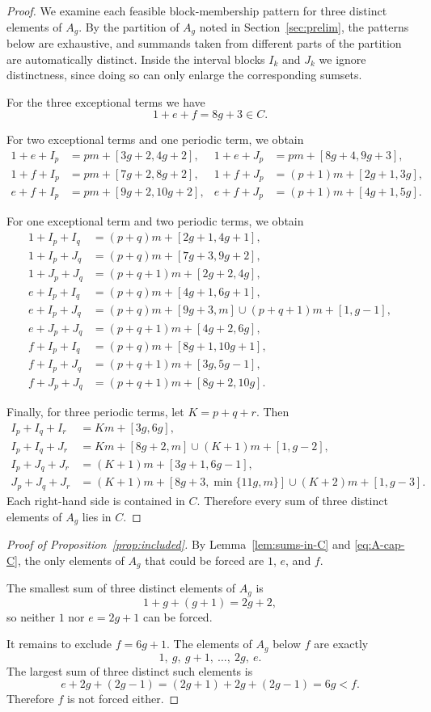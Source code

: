 \documentclass[12pt]{article}
\begin{document}
\begin{proof}
We examine each feasible block-membership pattern for three distinct elements of $A_g$. By the partition of $A_g$ noted in Section~\ref{sec:prelim}, the patterns below are exhaustive, and summands taken from different parts of the partition are automatically distinct. Inside the interval blocks $I_k$ and $J_k$ we ignore distinctness, since doing so can only enlarge the corresponding sumsets.

For the three exceptional terms we have
\[
1+e+f=8g+3\in C.
\]

For two exceptional terms and one periodic term, we obtain
\begin{align*}
1+e+I_p &= pm+[3g+2,4g+2],
& 1+e+J_p &= pm+[8g+4,9g+3], \\
1+f+I_p &= pm+[7g+2,8g+2],
& 1+f+J_p &= (p+1)m+[2g+1,3g], \\
e+f+I_p &= pm+[9g+2,10g+2],
& e+f+J_p &= (p+1)m+[4g+1,5g].
\end{align*}

For one exceptional term and two periodic terms, we obtain
\begin{align*}
1+I_p+I_q &= (p+q)m+[2g+1,4g+1], \\
1+I_p+J_q &= (p+q)m+[7g+3,9g+2], \\
1+J_p+J_q &= (p+q+1)m+[2g+2,4g], \\
e+I_p+I_q &= (p+q)m+[4g+1,6g+1], \\
e+I_p+J_q &= (p+q)m+[9g+3,m]\cup(p+q+1)m+[1,g-1], \\
e+J_p+J_q &= (p+q+1)m+[4g+2,6g], \\
f+I_p+I_q &= (p+q)m+[8g+1,10g+1], \\
f+I_p+J_q &= (p+q+1)m+[3g,5g-1], \\
f+J_p+J_q &= (p+q+1)m+[8g+2,10g].
\end{align*}

Finally, for three periodic terms, let $K=p+q+r$. Then
\begin{align*}
I_p+I_q+I_r &= Km+[3g,6g], \\
I_p+I_q+J_r &= Km+[8g+2,m]\cup(K+1)m+[1,g-2], \\
I_p+J_q+J_r &= (K+1)m+[3g+1,6g-1], \\
J_p+J_q+J_r &= (K+1)m+[8g+3,\min\{11g,m\}]\cup(K+2)m+[1,g-3].
\end{align*}
Each right-hand side is contained in $C$. Therefore every sum of three distinct elements of $A_g$ lies in $C$.
\end{proof}

\begin{proof}[Proof of Proposition~\ref{prop:included}]
By Lemma~\ref{lem:sums-in-C} and \eqref{eq:A-cap-C}, the only elements of $A_g$ that could be forced are $1$, $e$, and $f$.

The smallest sum of three distinct elements of $A_g$ is
\[
1+g+(g+1)=2g+2,
\]
so neither $1$ nor $e=2g+1$ can be forced.

It remains to exclude $f=6g+1$. The elements of $A_g$ below $f$ are exactly
\[
1,\ g,\ g+1,\ \ldots,\ 2g,\ e.
\]
The largest sum of three distinct such elements is
\[
e+2g+(2g-1)=(2g+1)+2g+(2g-1)=6g<f.
\]
Therefore $f$ is not forced either.
\end{proof}
\end{document}
